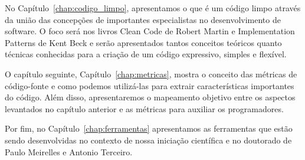 No Capítulo~\ref{chap:codigo_limpo}, apresentamos o que é um código limpo através
da união das concepções de importantes especialistas no desenvolvimento de software.
O foco será nos livros Clean Code de Robert Martin \cite{Martin2008} e Implementation
Patterns de Kent Beck \cite{Kent2007} e serão apresentados tantos conceitos teóricos
quanto técnicas conhecidas para a criação de um código expressivo, simples e flexível.

O capítulo seguinte, Capítulo~\ref{chap:metricas}, mostra o conceito das métricas de 
código-fonte e como podemos utilizá-las para extrair características importantes do
código. Além disso, apresentaremos o mapeamento objetivo entre os aspectos levantados
no capítulo anterior e as métricas para auxiliar os programadores.

Por fim, no Capítulo~\ref{chap:ferramentas} apresentamos as ferramentas que estão sendo desenvolvidas
no contexto de nossa iniciação científica e no doutorado de Paulo Meirelles e Antonio Terceiro.
